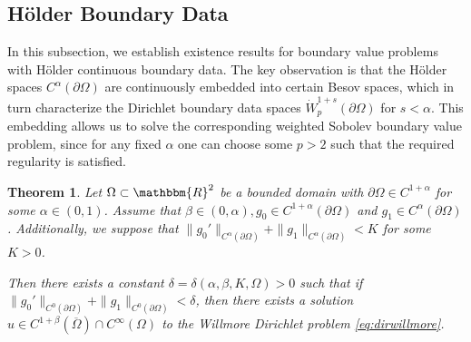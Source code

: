 \documentclass[12pt,a4paper,twoside]{article}
\newcommand{\R}{\mathbbm {R}}
\newtheorem{thm}{Theorem}
\begin{document}
\subsection{Hölder Boundary Data}
\label{subsec:hoelderboundary}
In this subsection, we establish existence results for boundary value problems with Hölder continuous boundary data. The key observation is that the Hölder spaces $C^{\alpha}(\partial\Omega)$ are  continuously embedded into certain Besov spaces, which in turn characterize the Dirichlet boundary data spaces $ \dot W^{1+s }_p(\partial\Omega)$ for $s<\alpha$. This embedding allows us to solve the corresponding weighted Sobolev boundary value problem, since for any fixed $\alpha$ one can choose some $p>2$ such that the required regularity is satisfied.
\setcounter{thm}{0}
\begin{thm}
Let $\Omega\subset\R^2$ be a bounded domain with $\partial\Omega\in C^{1+\alpha}$ for some $\alpha\in(0,1)$. Assume that $\beta\in(0,\alpha), g_0\in C^{1+\alpha}(\partial\Omega)$ and $g_1\in C^{\alpha}(\partial\Omega)$. Additionally, we suppose that $\|g_0'\|_{C^{\alpha}(\partial\Omega)}+ \|g_1\|_{C^{\alpha}(\partial\Omega)} <K$ for some $K>0$. 

Then there exists a constant $\delta=\delta(\alpha,\beta, K, \Omega)>0$ such that if $\|g_0'\|_{C^0(\partial\Omega)}+\|g_1\|_{C^{0}(\partial\Omega)}<\delta$, then there exists a solution $u\in C^{1+\beta}(\overline\Omega)\cap C^\infty(\Omega)$ to the Willmore Dirichlet problem \eqref{eq:dirwillmore}.

\end{thm}
\end{document}
